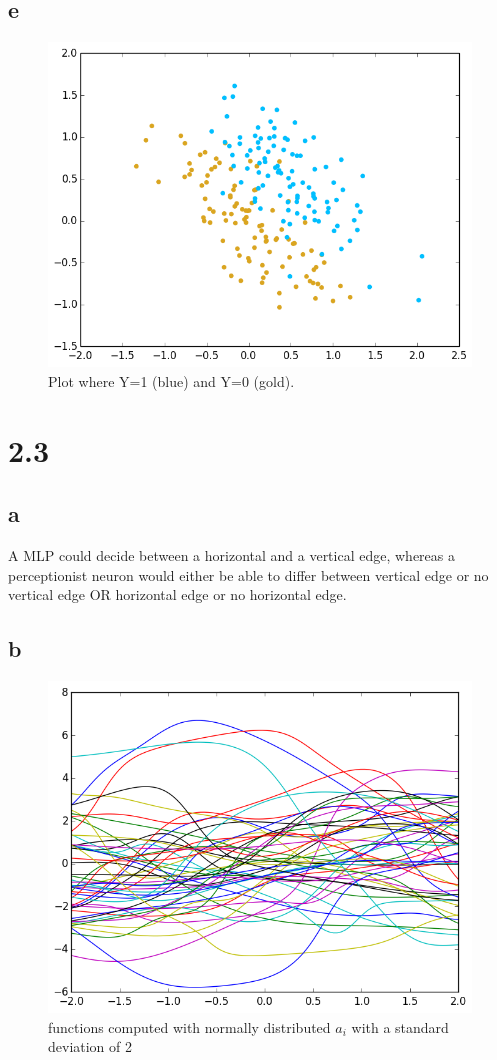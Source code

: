 \documentclass[11pt,a4paper]{article}
\begin{document}
\subsection*{e}
\begin{figure}[h]
\centering
 \includegraphics[width=\textwidth]{./2_2_a.png}
\caption{Plot where Y=1 (blue) and Y=0 (gold).}
\end{figure}

\section*{2.3}
\subsection*{a}
A MLP could decide between a horizontal and a vertical edge, whereas a perceptionist neuron would either be able to differ between
vertical edge or no vertical edge OR horizontal edge or no horizontal edge.
\subsection*{b}
\begin{figure}[h]
\centering
 \includegraphics[width=\textwidth]{./2_3_std=2.png}
\caption{functions computed with normally distributed $a_i$ with a standard deviation of 2}
\end{figure}
\newpage
\end{document}
